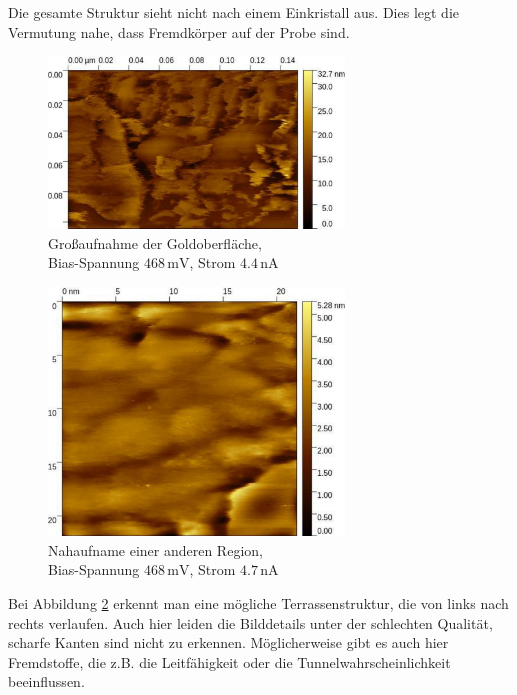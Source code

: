 \documentclass[12pt,a4paper]{scrartcl}
\numberwithin{equation}{section} %
\begin{document}
Die gesamte Struktur sieht nicht nach einem Einkristall aus. Dies legt die Vermutung nahe, dass Fremdkörper auf der Probe sind.

\begin{figure}[ht]
	\centering
	\includegraphics[width=0.7\textwidth]{../media/B2.5/Gold_gross.pdf}
	\caption{Großaufnahme der Goldoberfläche, \\
		Bias-Spannung $468\mathrm{\,mV}$, Strom $4.4 \mathrm{\,nA}$}
	\label{abb:Gold gross}
\end{figure}
	
\begin{figure}[ht]
	\centering
	\includegraphics[width=0.7\textwidth]{../media/B2.5/Gold_Stufenkante.pdf}
	\caption{Nahaufname einer anderen Region, \\
		Bias-Spannung $468\mathrm{\,mV}$, Strom $4.7 \mathrm{\,nA}$}
	\label{abb:Gold stufe}
\end{figure}

Bei Abbildung \ref{abb:Gold stufe} erkennt man eine mögliche Terrassenstruktur, die von links nach rechts verlaufen. Auch hier leiden die Bilddetails unter der schlechten Qualität, scharfe Kanten sind nicht zu erkennen. Möglicherweise gibt es auch hier Fremdstoffe, die z.B. die Leitfähigkeit oder die Tunnelwahrscheinlichkeit beeinflussen.
\end{document}

